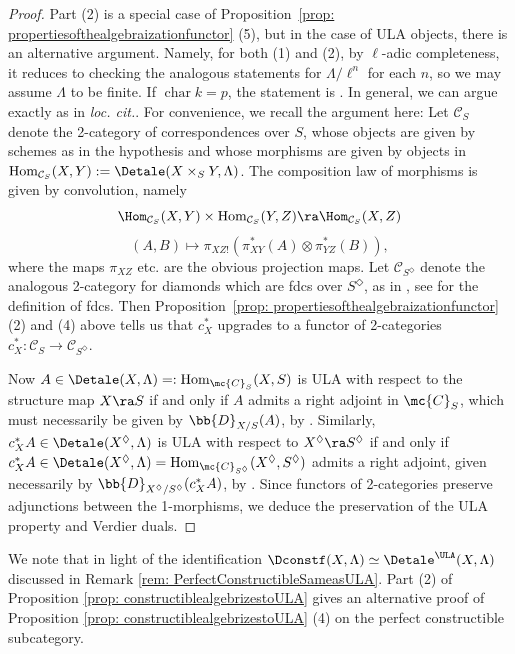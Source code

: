 \documentclass[letterpaper,11pt]{amsart}
\begin{document}
\begin{proof}
Part (2) is a special case of Proposition~\ref{prop: propertiesofthealgebraizationfunctor} (5), but in the case of ULA objects, there is an alternative argument. Namely, for both (1) and (2), by $\ell$-adic completeness, it reduces to checking the analogous statements for $\Lambda/\ell^n$ for each $n$, so we may assume $\Lambda$ to be finite. If $\operatorname{char}k=p$, the statement is \cite[Proposition~A.1]{AGLRLocalModels}. In general, we can argue exactly as in \textit{loc. cit.}. For convenience, we recall the argument here: Let $\mathcal{C}_{S}$ denote the 2-category of correspondences over $S$, whose objects are given by schemes as in the hypothesis and whose morphisms are given by objects in $\mathrm{Hom}_{\mathcal{C}_{S}}(X,Y) := \Detale(X \times_S Y,\Lambda)$. The composition law of morphisms is given by convolution, namely
\[ \Hom_{\mathcal{C}_{S}}(X,Y) \times \mathrm{Hom}_{\mathcal{C}_{S}}(Y,Z) \ra \Hom_{\mathcal{C}_{S}}(X,Z)\] 
\[ (A,B) \mapsto \pi_{XZ!}(\pi_{XY}^\ast(A) \otimes \pi_{YZ}^\ast(B)), \]
where the maps $\pi_{XZ}$ etc. are the obvious projection maps. Let $\mathcal{C}_{S^\Diamond}$ denote the analogous 2-category for diamonds which are fdcs over $S^\Diamond$, as in \cite[Section~IV.2.23]{FSGeomLLC}, see \cite[Definition 5.4]{Mann2022NuclearSheaves} for the definition of fdcs. Then Proposition~\ref{prop: propertiesofthealgebraizationfunctor} (2) and (4) above tells us that $c_{X}^{*}$ upgrades to a functor of 2-categories $c_{X}^{*}: \mathcal{C}_{S} \to \mathcal{C}_{S^\Diamond}$.

Now $A \in \Detale(X,\Lambda) =:\mathrm{Hom}_{\mc{C}_{S}}(X,S)$ is ULA with respect to the structure map $X \ra S$ if and only if $A$ admits a right adjoint in $\mc{C}_{S}$, which must necessarily be given by $\bb{D}_{X/S}(A)$, by \cite[Definition~3.2, Proposition~3.4(ii)]{HansenScholzeRelativePerversity}. Similarly, $c_X^\ast A \in \Detale(X^{\Diamond},\Lambda)$ is ULA with respect to $X^{\Diamond} \ra S^\Diamond$ if and only if $c_{X}^{*}A \in \Detale(X^{\Diamond},\Lambda) = \mathrm{Hom}_{\mc{C}_{S^\Diamond}}(X^{\Diamond},S^\Diamond)$ admits a right adjoint, given necessarily by $\bb{D}_{X^\Diamond/S^\Diamond}(c^\ast_XA)$, by \cite[Theorem~IV.2.23]{FSGeomLLC}. Since functors of 2-categories preserve adjunctions between the 1-morphisms, we deduce the preservation of the ULA property and Verdier duals.
\end{proof}
\begin{remark}
We note that in light of the identification $\Dconstf(X,\Lambda) \simeq \Detale^{\ULA}(X,\Lambda)$ discussed in Remark \ref{rem: PerfectConstructibleSameasULA}. Part (2) of Proposition \ref{prop: constructiblealgebrizestoULA} gives an alternative proof of Proposition \ref{prop: constructiblealgebrizestoULA} (4) on the perfect constructible subcategory.
\end{remark}
\end{document}
